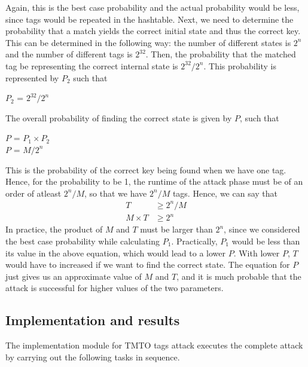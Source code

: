 Again, this is the best case probability and the actual probability would be less, since tags would be repeated in the hashtable. Next, we need to determine the probability that a match yields the correct initial state and thus the correct key. This can be determined in the following way: the number of different states is $2^n$ and the number of different tags is $2^{32}$. Then, the probability that the matched tag be representing the correct internal state is $2^{32}/2^n$. This probability is represented by $P_2$ such that
\begin{center}
$P_2$ = $2^{32}/2^n$
\end{center}
The overall probability of finding the correct state is given by $P$, such that
\begin{center}
$P$ = $P_1 \times P_2$\\
$P$ = $M/2^{n}$\\
\end{center}
This is the probability of the correct key being found when we have one tag. Hence, for the probability to be 1, the runtime of the attack phase must be of an order of atleast $2^{n}/M$, so that we have $2^{n}/M$ tags. Hence, we can say that
\begin{align*}
T &\geq 2^{n}/M\\
M \times T &\geq 2^{n}
\end{align*}
In practice, the product of $M$ and $T$ must be larger than $2^n$, since we considered the best case probability while calculating $P_1$. Practically, $P_1$ would be less than its value in the above equation, which would lead to a lower $P$. With lower $P$, $T$ would have to increased if we want to find the correct state. The equation for $P$ just gives us an approximate value of $M$ and $T$, and it is much probable that the attack is successful for higher values of the two parameters.

\subsection{Implementation and results}

The implementation module for TMTO tags attack executes the complete attack by carrying out the following tasks in sequence. 

